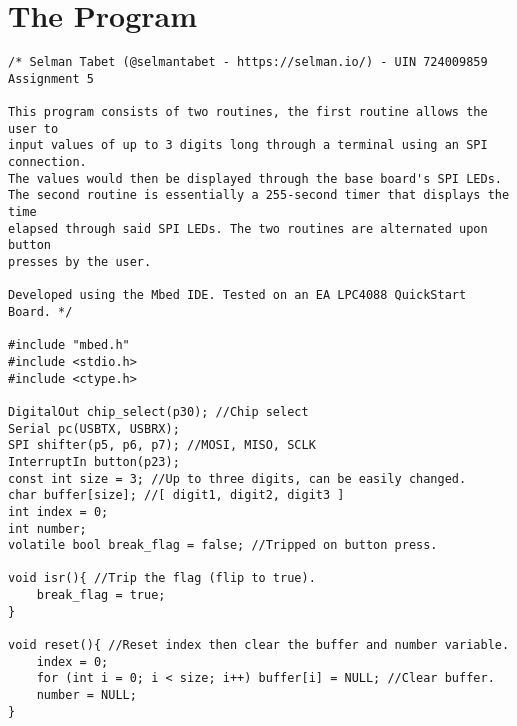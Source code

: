 \documentclass{article}
\begin{document}
\section*{The Program}
\begin{verbatim}
/* Selman Tabet (@selmantabet - https://selman.io/) - UIN 724009859
Assignment 5

This program consists of two routines, the first routine allows the user to 
input values of up to 3 digits long through a terminal using an SPI connection.
The values would then be displayed through the base board's SPI LEDs.
The second routine is essentially a 255-second timer that displays the time
elapsed through said SPI LEDs. The two routines are alternated upon button
presses by the user.

Developed using the Mbed IDE. Tested on an EA LPC4088 QuickStart Board. */

#include "mbed.h"
#include <stdio.h>
#include <ctype.h>

DigitalOut chip_select(p30); //Chip select
Serial pc(USBTX, USBRX);
SPI shifter(p5, p6, p7); //MOSI, MISO, SCLK
InterruptIn button(p23);
const int size = 3; //Up to three digits, can be easily changed.
char buffer[size]; //[ digit1, digit2, digit3 ]
int index = 0;
int number;
volatile bool break_flag = false; //Tripped on button press.

void isr(){ //Trip the flag (flip to true).
    break_flag = true;
}
    
void reset(){ //Reset index then clear the buffer and number variable.
    index = 0;
    for (int i = 0; i < size; i++) buffer[i] = NULL; //Clear buffer.
    number = NULL;
}


\end{verbatim}
\end{document}
